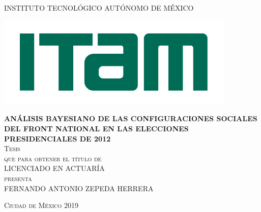 \begin{titlepage}

\begin{center}

\textsc{\large{INSTITUTO TECNOLÓGICO AUTÓNOMO DE MÉXICO}}\\[2.2em]

\begin{center}
	\includegraphics[width=11.4cm, height = 4.4cm]{Figs/logo-ITAM.pdf}
\end{center}

\textsc{\large \textbf{ANÁLISIS BAYESIANO DE LAS CONFIGURACIONES SOCIALES DEL FRONT NATIONAL EN LAS ELECCIONES PRESIDENCIALES DE 2012}}\\[2.2em]

\textsc{\large Tesis}\\[2em]

\textsc{que para obtener el título de}\\[1em]

\textsc{LICENCIADO EN ACTUARÍA}\\[1em]

\textsc{presenta}\\[2.2em]

\textsc{\Large FERNANDO ANTONIO ZEPEDA HERRERA}\\[2.2em]


\end{center}

\vspace*{\fill}
\textsc{Ciudad de México \hspace*{\fill} 2019}

\end{titlepage}